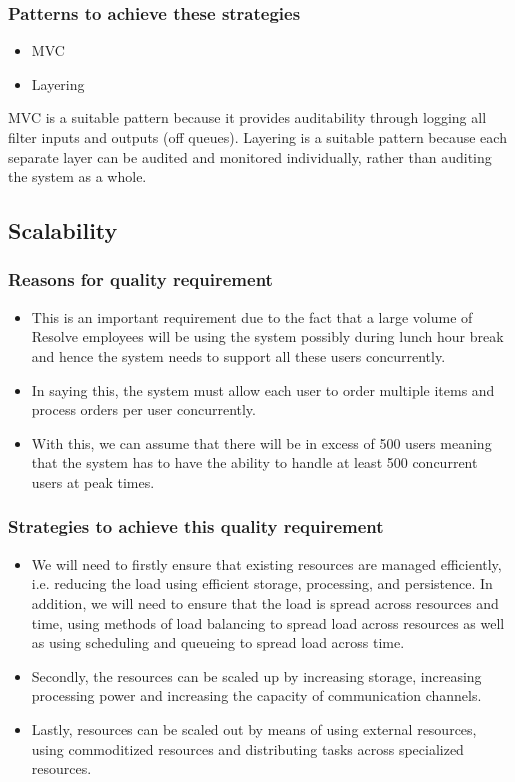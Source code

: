 \documentclass[a4paper,12pt]{article}
\begin{document}
 \subsubsection{Patterns to achieve these strategies}
 \begin{itemize}
 \item MVC
 \item Layering
\end{itemize} 
 MVC is a suitable pattern because it provides auditability through logging all filter inputs and outputs (off queues). Layering is a suitable pattern because each separate layer can be audited and monitored individually, rather than auditing the system as a whole.
  
\subsection{Scalability}
	\subsubsection{Reasons for quality requirement}
	\begin{itemize}
	\item This is an important requirement due to the fact that a large volume of Resolve employees will be using the system possibly during lunch hour break and hence the system needs to support all these users concurrently. 
	\item In saying this, the system must allow each user to order multiple items and process orders per user concurrently.
	\item With this, we can assume that there will be in excess of 500 users meaning that the system has to have the ability to handle at least 500 concurrent users at peak times.
	\end{itemize}
	\subsubsection{Strategies to achieve this quality requirement}
	\begin{itemize}
		\item We will need to firstly ensure that existing resources are managed efficiently, i.e. reducing the load using efficient storage, processing,  and persistence. In addition, we will need to ensure that the load is spread across resources and time, using methods of load balancing to spread load across resources as well as using scheduling and queueing to spread load across time.
		\item Secondly, the resources can be scaled up by increasing storage, increasing processing power and increasing the capacity of communication channels.
		\item Lastly, resources can be scaled out by means of using external resources, using commoditized resources and distributing tasks across specialized resources.
		\end{itemize}
\end{document}
